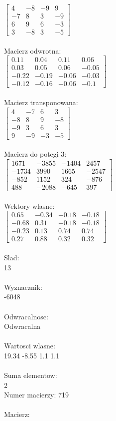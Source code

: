 \documentclass[a4paper,12pt]{article}
\begin{document}
$\begin{bmatrix} 4&-8&-9&9\\-7&8&3&-9\\6&9&6&-3\\3&-8&3&-5 \end{bmatrix}$
\\
\\
Macierz odwrotna:\\

$\begin{bmatrix} 0.11&0.04&0.11&0.06\\0.03&0.05&0.06&-0.05\\-0.22&-0.19&-0.06&-0.03\\-0.12&-0.16&-0.06&-0.1 \end{bmatrix}$
\\
\\
Macierz transponowana:\\

$\begin{bmatrix} 4&-7&6&3\\-8&8&9&-8\\-9&3&6&3\\9&-9&-3&-5 \end{bmatrix}$
\\
\\
Macierz do potegi 3:\\

$\begin{bmatrix} 1671&-3855&-1404&2457\\-1734&3990&1665&-2547\\-852&1152&324&-876\\488&-2088&-645&397 \end{bmatrix}$
\\
\\
Wektory wlasne:\\

$\begin{bmatrix} 0.65&-0.34&-0.18&-0.18\\-0.68&0.31&-0.18&-0.18\\-0.23&0.13&0.74&0.74\\0.27&0.88&0.32&0.32 \end{bmatrix}$
\\
\\
Slad:\\
13
\\
\\
Wyznacznik:\\
-6048
\\
\\
Odwracalnosc:\\
Odwracalna
\\
\\
Wartosci wlasne:\\
19.34 -8.55 1.1 1.1
\\
\\
Suma elementow:\\
2
\\
\newpage
Numer macierzy:
719
\\
\\
Macierz:\\
\end{document}
